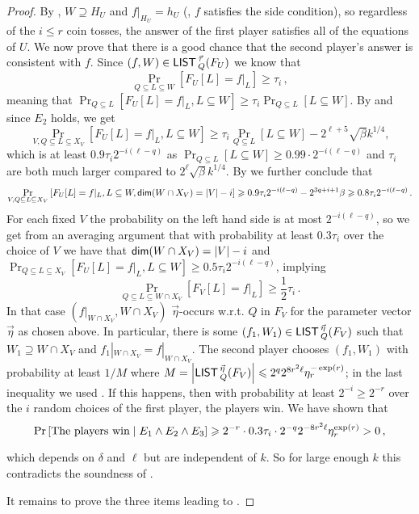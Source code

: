 \documentclass{toc}
\newcommand\card[1]{\left| {#1} \right|}
\newcommand\Prob[2]{{\Pr_{#1}\left[ {#2} \right]}}
\renewcommand\geq{\geqslant}
\renewcommand\ge{\geqslant}
\renewcommand\le{\leqslant}
\renewcommand\subset{\subseteq}
\renewcommand\supset{\supseteq}
\def\M{{\sf LIST\,}}
\begin{document}
\begin{proof}
By , $W\supset H_U$ and
$f|_{H_U}=h_U$ (\ie, $f$ satisfies the side condition), so regardless
of the $i\le r$ coin tosses, the answer of the first player satisfies
all of the equations of $U$. We now prove that there is a good chance
that the second player's answer is consistent with $f$. Since
$(f,W)\in\M^{\vec\tau}_Q(F_U)$ we know that
\[ \Prob{Q \subset L \subset W} { F_U[L] = f|_L } \ge \tau_i\, ,
\]
%
meaning that
$\Prob{Q\subseteq L}{F_U[L]=f|_{L}, L\subseteq W}\geq \tau_i \Prob{Q\subseteq L}{L\subseteq W}$.
By  and
since $E_2$ holds, we get
\[
\Prob{V, Q\subseteq L\subseteq X_V}{F_U[L]=f|_{L}, L\subseteq W}\geq
\tau_i \Prob{Q\subseteq L}{L\subseteq W}-2^{\ell+5}\sqrt{\beta}k^{1/4},
\]
which is at least $0.9\tau_i 2^{-i(\ell-q)}$ as
$\Prob{Q\subseteq L}{L\subseteq W} \geq 0.99\cdot 2^{-i(\ell-q)}$ and $\tau_i$ are both much
larger compared to $2^{\ell}\sqrt{\beta}k^{1/4}$. By  we further conclude that
\[
\Prob{V, Q\subseteq L\subseteq X_V}{F_U[L]=f|_{L}, L\subseteq W, {\sf dim}(W\cap X_V)=|V| - i}\geq
0.9\tau_i 2^{-i(\ell-q)} - 2^{3q+i+1}\beta
\geq
0.8\tau_i 2^{-i(\ell-q)}\,.
\]
For each fixed $V$ the probability on the left hand side is at most $2^{-i(\ell-q)}$, so we get from an averaging argument
that with probability at least $0.3\tau_i$ over the choice of $V$ we have that ${\sf dim}(W\cap X_V)=|V|-i$ and
$\Prob{Q\subseteq L\subseteq X_V}{F_U[L]=f|_{L}, L\subseteq W}\geq 0.5\tau_i 2^{-i(\ell-q)}$, implying
\[
%
\Prob{Q \subset L \subset W\cap X_V} { F_V[L] = f|_L }\geq \frac{1}{2}\tau_i\,.
\]
%
In that case $(f|_{W\cap X_V},W\cap X_V)$ $\vec\eta$-occurs w.r.t. $Q$ in $F_V$ for the parameter vector $\vec\eta$ as chosen above. In particular, there is some $(f_1,W_1)\in\M^{\vec\eta}_Q(F_V)$ such that $W_1\supseteq W\cap X_V$ and $f_1|_{W\cap X_V}=f|_{W\cap X_V}$. The second player chooses $(f_1,W_1)$ with probability at least $1/M$ where $M = \card{\M_Q^{\vec\eta}(F_V)}\le 2^q 2^{8r^2\ell}\eta_r^{-\exp(r)}$;
 in the last inequality we used . %
If this happens, then with probability at least $2^{-i}\ge 2^{-r}$ over the $i$ random choices of the first player, the players win. We have shown that
\[ \Prob{}{\hbox{The players win} \mid E_1\wedge E_2\wedge E_3} \ge 2^{-r} \cdot 0.3\tau_i\cdot 2^{-q}2^{-8r^2\ell}\eta_r^{\exp(r)}>0\,,
\]
which depends on $\delta$ and $\ell$ but are independent of $k$. So for large enough $k$ this contradicts the soundness of .

It remains to prove the three items leading to .

\end{proof}
\end{document}
